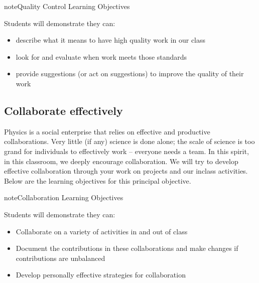 \documentclass[letterpaper,10pt,english]{jupyterBook}
\begin{document}
\begin{sphinxadmonition}{note}{Quality Control Learning Objectives}

\sphinxAtStartPar
Students will demonstrate they can:
\begin{itemize}
\item {} 
\sphinxAtStartPar
describe what it means to have high quality work in our class

\item {} 
\sphinxAtStartPar
look for and evaluate when work meets those standards

\item {} 
\sphinxAtStartPar
provide suggestions (or act on suggestions) to improve the quality of their work

\end{itemize}
\end{sphinxadmonition}


\subsection{Collaborate effectively}
\label{\detokenize{content/0_course/1_goals:collaborate-effectively}}
\sphinxAtStartPar
Physics is a social enterprise that relies on effective and productive collaborations. Very little (if any) science is done alone; the scale of science is too grand for individuals to effectively work – everyone needs a team. In this spirit, in this classroom, we deeply encourage collaboration. We will try to develop effective collaboration through your work on projects and our in\sphinxhyphen{}class activities. Below are the learning objectives for this principal objective.

\begin{sphinxadmonition}{note}{Collaboration Learning Objectives}

\sphinxAtStartPar
Students will demonstrate they can:
\begin{itemize}
\item {} 
\sphinxAtStartPar
Collaborate on a variety of activities in and out of class

\item {} 
\sphinxAtStartPar
Document the contributions in these collaborations and make changes if contributions are unbalanced

\item {} 
\sphinxAtStartPar
Develop personally effective strategies for collaboration

\end{itemize}
\end{sphinxadmonition}
\end{document}

